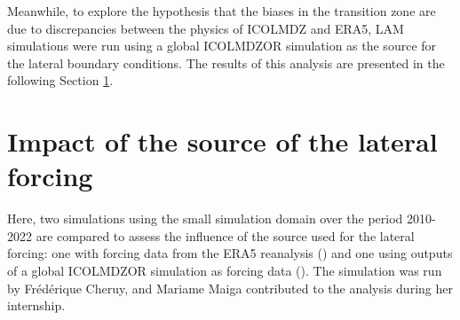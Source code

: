 Meanwhile, to explore the hypothesis that the biases in the transition zone are due to discrepancies between the physics of ICOLMDZ and ERA5, LAM simulations were run using a global ICOLMDZOR simulation as the source for the lateral boundary conditions. The results of this analysis are presented in the following Section \ref{sec:forcing_source}.

\clearpage

\section{Impact of the source of the lateral forcing}
\label{sec:forcing_source}

Here, two simulations using the small simulation domain over the period 2010-2022 are compared to assess the influence of the source used for the lateral forcing: one with forcing data from the ERA5 reanalysis (\forcingERA) and one using outputs of a global ICOLMDZOR simulation as forcing data (\forcingICO). 
The \forcingICO simulation was run by Frédérique Cheruy, and Mariame Maiga contributed to the analysis during her internship.

